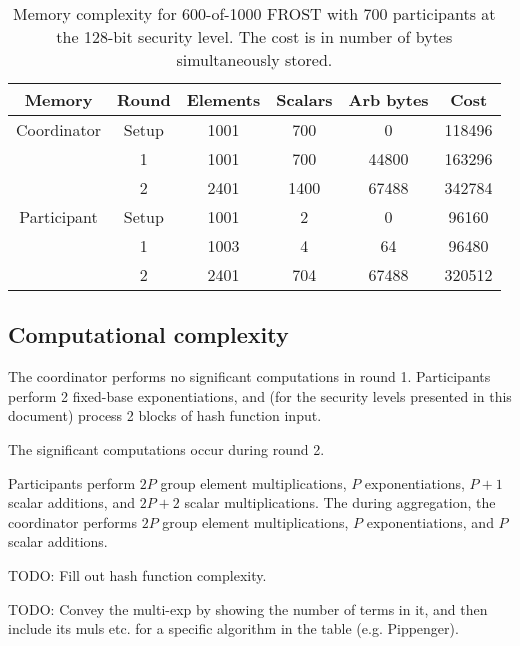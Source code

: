 \begin{table}
	\centering
	\begin{tabular}{c c c c c c}
		\toprule
		Memory & Round & Elements & Scalars & Arb bytes & Cost \\ \midrule
		Coordinator & Setup & 1001 & 700 & 0 & 118496 \\
		            & 1 & 1001 & 700 & 44800 & 163296 \\
		            & 2 & 2401 & 1400 & 67488 & 342784 \\
		\midrule
		Participant & Setup & 1001 & 2 & 0 & 96160 \\
		            & 1 & 1003 & 4 & 64 & 96480 \\
		            & 2 & 2401 & 704 & 67488 & 320512 \\
		\bottomrule
	\end{tabular}
	\caption{Memory complexity for 600-of-1000 FROST with 700 participants at the 128-bit security level. The cost is in number of bytes simultaneously stored.}
\end{table}

\subsection{Computational complexity}

The coordinator performs no significant computations in round 1. Participants
perform 2 fixed-base exponentiations, and (for the security levels presented in
this document) process 2 blocks of hash function input.

The significant computations occur during round 2.

Participants perform $2P$ group element multiplications, $P$ exponentiations,
$P + 1$ scalar additions, and $2P + 2$ scalar multiplications. The during
aggregation, the coordinator performs $2P$ group element multiplications, $P$
exponentiations, and $P$ scalar additions.

TODO: Fill out hash function complexity.

TODO: Convey the multi-exp by showing the number of terms in it, and then include
its muls etc. for a specific algorithm in the table (e.g. Pippenger).

